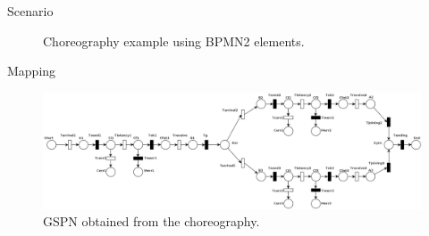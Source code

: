 \documentclass[xcolor=svgnames]{beamer}
\begin{document}
\begin{frame}{Scenario}
{\begin{figure}[!h]
		\caption{Choreography example using BPMN2 elements.}
            \end{figure}
        }
  \end{frame}


  \begin{frame}{Mapping}
    \begin{figure}[!h]
    	\centering
    	\includegraphics[width=1.0\textwidth]{BPMNChoreographyExample-QoS.png}
    	\caption{GSPN obtained from the choreography.}
    \end{figure}
  \end{frame}
\end{document}
